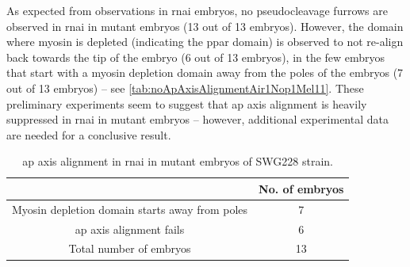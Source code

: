 As expected from observations in  \ac{rnai} embryos, no pseudocleavage furrows are observed in  \ac{rnai} in  mutant embryos (\num{13} out of \num{13} embryos). However, the domain where myosin is depleted (indicating the \ac{ppar} domain) is observed to not re-align back towards the tip of the embryo (\num{6} out of \num{13} embryos), in the few embryos that start with a myosin depletion domain away from the poles of the embryos (\num{7} out of \num{13} embryos) -- see \autoref{tab:noApAxisAlignmentAir1Nop1Mel11}. These preliminary experiments seem to suggest that \ac{ap} axis alignment is heavily suppressed in  \ac{rnai} in  mutant embryos -- however, additional experimental data are needed for a conclusive result.

\begin{table}
    \centering
    \begin{tabular}{|c|c|}
        \hline
         & No. of embryos \\
         \hline
         Myosin depletion domain starts away from poles & \num{7}\\
         \ac{ap} axis alignment fails & \num{6}\\
         Total number of embryos & \num{13}\\
         \hline
    \end{tabular}
    \caption{\ac{ap} axis alignment in  \ac{rnai} in  mutant embryos of SWG228 strain.}
    \label{tab:noApAxisAlignmentAir1Nop1Mel11}
\end{table}

\FloatBarrier
